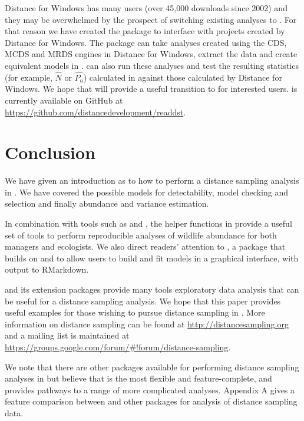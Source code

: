 \documentclass[article]{jss}\usepackage[]{graphicx}\usepackage[]{color}
\begin{document}
Distance for Windows has many users (over 45,000 downloads since 2002) and they may be overwhelmed by the prospect of switching existing analyses to . For that reason we have created the  \citep{readdst-pkg} package to interface with projects created by Distance for Windows. The package can take analyses created using the CDS, MCDS and MRDS engines in Distance for Windows, extract the data and create equivalent models in .  can also run these analyses and test the resulting statistics (for example, $\hat{N}$ or $\hat{P_a}$) calculated in  against those calculated by Distance for Windows. We hope that  will provide a useful transition to  for interested users.  is currently available on GitHub at \url{https://github.com/distancedevelopment/readdst}.

\section{Conclusion}

We have given an introduction as to how to perform a distance sampling analysis in . We have covered the possible models for detectability, model checking and selection and finally abundance and variance estimation.

In combination with tools such as  and  \citep{rmarkdown-pkg}, the helper functions in  provide a useful set of tools to perform reproducible analyses of wildlife abundance for both managers and ecologists. We also direct readers' attention to  \citep{dsshiny-pkg}, a package that builds on  \citep{shiny-pkg} and  to allow users to build and fit models in a graphical interface, with output to RMarkdown.

 and its extension packages provide many tools exploratory data analysis that can be useful for a distance sampling analysis. We hope that this paper provides useful examples for those wishing to pursue distance sampling in . More information on distance sampling can be found at \url{http://distancesampling.org} and a mailing list is maintained at \url{https://groups.google.com/forum/#!forum/distance-sampling}.

We note that there are other packages available for performing distance sampling analyses in  but believe that  is the most flexible and feature-complete, and provides pathways to a range of more complicated analyses. Appendix A gives a feature comparison between  and other  packages for analysis of distance sampling data.
\end{document}
